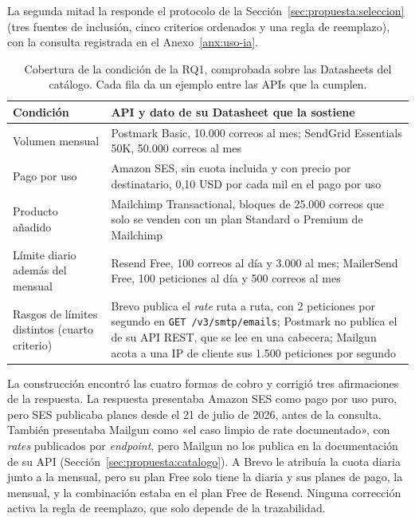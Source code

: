 La segunda mitad la responde el protocolo de la Sección~\ref{sec:propuesta:seleccion} (tres fuentes de inclusión, cinco criterios ordenados y una regla de reemplazo), con la consulta registrada en el Anexo~\ref{anx:uso-ia}.

\begin{table}[tbp]
\centering
\small
\begin{tabular}{|>{\raggedright\arraybackslash}p{3.6cm}|>{\raggedright\arraybackslash}p{10.4cm}|}
\hline
\textbf{Condición} & \textbf{API y dato de su Datasheet que la sostiene} \\
\hline
Volumen mensual & Postmark Basic, 10.000 correos al mes; SendGrid Essentials 50K, 50.000 correos al mes \\
\hline
Pago por uso & Amazon SES, sin cuota incluida y con precio por destinatario, 0,10 USD por cada mil en el pago por uso \\
\hline
Producto añadido & Mailchimp Transactional, bloques de 25.000 correos que solo se venden con un plan Standard o Premium de Mailchimp \\
\hline
Límite diario además del mensual & Resend Free, 100 correos al día y 3.000 al mes; MailerSend Free, 100 peticiones al día y 500 correos al mes \\
\hline
Rasgos de límites distintos (cuarto criterio) & Brevo publica el \textit{rate} ruta a ruta, con 2 peticiones por segundo en \texttt{GET /v3/smtp/emails}; Postmark no publica el de su API REST, que se lee en una cabecera; Mailgun acota a una IP de cliente sus 1.500 peticiones por segundo \\
\hline
\end{tabular}
\caption[Cobertura de la condición de la RQ1 sobre las Datasheets]{Cobertura de la condición de la RQ1, comprobada sobre las Datasheets del catálogo. Cada fila da un ejemplo entre las APIs que la cumplen.}
\label{tab:propuesta:cobertura}
\end{table}

La construcción encontró las cuatro formas de cobro y corrigió tres afirmaciones de la respuesta.
La respuesta presentaba Amazon SES como pago por uso puro, pero SES publicaba planes desde el 21 de julio de 2026, antes de la consulta.
También presentaba Mailgun como «el caso limpio de rate documentado», con \textit{rates} publicados por \textit{endpoint}, pero Mailgun no los publica en la documentación de su API (Sección~\ref{sec:propuesta:catalogo}).
A Brevo le atribuía la cuota diaria junto a la mensual, pero su plan Free solo tiene la diaria y sus planes de pago, la mensual, y la combinación estaba en el plan Free de Resend.
Ninguna corrección activa la regla de reemplazo, que solo depende de la trazabilidad.

